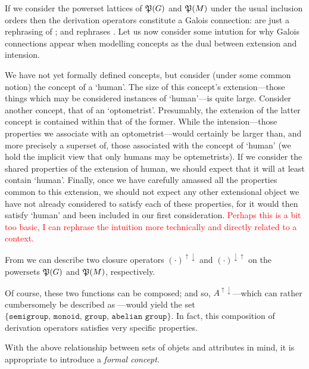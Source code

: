 If we consider the powerset lattices of $\mathfrak{P}({G})$ and $\mathfrak{P}({M})$ under the usual inclusion orders then the derivation operators constitute
a Galois connection:  are just a rephrasing of ;
and  rephrases . Let us now consider some intution for why Galois connections appear
when modelling concepts as the dual between extension and intension.

We have not yet formally defined concepts, but consider (under some common notion) the concept of a `human'. The size of this concept's extension---those
things which may be considered instances of `human'---is quite large. Consider another concept, that of an `optometrist'. Presumably, the extension
of the latter concept is contained within that of the former. While the intension---those properties we associate with an optometrist---would
certainly be larger than, and more precisely a superset of, those associated with the concept of `human' (we hold the implicit view that only
humans may be optemetrists). If we consider the shared properties of the extension of human, we should expect that it will at least contain
`human'. Finally, once we have carefully amassed all the properties common to this extension, we should not expect any other extensional object
we have not already considered to satisfy each of these properties, for it would then satisfy `human' and been included in our first
consideration. \textcolor{red}{Perhaps this is a bit too basic, I can rephrase the intuition more technically and directly related to a context.}

From  we can describe two closure operators $(\cdot)^{\uparrow \downarrow}$ and $(\cdot)^{\downarrow
\uparrow}$ on the powersets $\mathfrak{P}({G})$ and $\mathfrak{P}({M})$, respectively.

Of course, these two functions can be composed; and so, $A^{\uparrow \downarrow}$---which can rather cumbersomely be described as ---would
yield the set $\{\texttt{semigroup, monoid, group, abelian group}\}$. In fact, this composition of derivation operators satisfies very
specific properties.%

With the above relationship between sets of objets and attributes in mind, it is appropriate to introduce a \textit{formal concept}.

